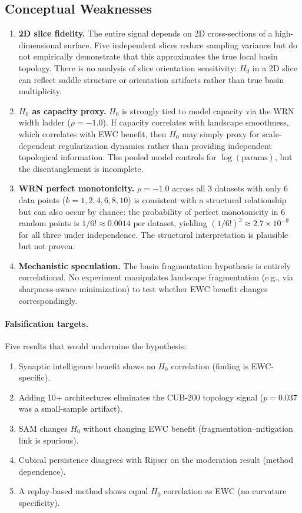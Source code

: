 \documentclass[10pt,twocolumn]{article}
\begin{document}
\subsection{Conceptual Weaknesses}
\begin{enumerate}
    \item \textbf{2D slice fidelity.} The entire signal depends on 2D cross-sections of a high-dimensional surface. Five independent slices reduce sampling variance but do not empirically demonstrate that this approximates the true local basin topology. There is no analysis of slice orientation sensitivity: $H_0$ in a 2D slice can reflect saddle structure or orientation artifacts rather than true basin multiplicity.
    \item \textbf{$H_0$ as capacity proxy.} $H_0$ is strongly tied to model capacity via the WRN width ladder ($\rho = -1.0$). If capacity correlates with landscape smoothness, which correlates with EWC benefit, then $H_0$ may simply proxy for scale-dependent regularization dynamics rather than providing independent topological information. The pooled model controls for $\log(\text{params})$, but the disentanglement is incomplete.
    \item \textbf{WRN perfect monotonicity.} $\rho = -1.0$ across all 3 datasets with only 6 data points ($k = 1, 2, 4, 6, 8, 10$) is consistent with a structural relationship but can also occur by chance: the probability of perfect monotonicity in 6 random points is $1/6! \approx 0.0014$ per dataset, yielding $(1/6!)^3 \approx 2.7 \times 10^{-9}$ for all three under independence. The structural interpretation is plausible but not proven.
    \item \textbf{Mechanistic speculation.} The basin fragmentation hypothesis is entirely correlational. No experiment manipulates landscape fragmentation (e.g., via sharpness-aware minimization) to test whether EWC benefit changes correspondingly.
\end{enumerate}

\paragraph{Falsification targets.} Five results that would undermine the hypothesis:
\begin{enumerate}
    \item Synaptic intelligence benefit shows no $H_0$ correlation (finding is EWC-specific).
    \item Adding 10+ architectures eliminates the CUB-200 topology signal ($p = 0.037$ was a small-sample artifact).
    \item SAM changes $H_0$ without changing EWC benefit (fragmentation--mitigation link is spurious).
    \item Cubical persistence disagrees with Ripser on the moderation result (method dependence).
    \item A replay-based method shows equal $H_0$ correlation as EWC (no curvature specificity).
\end{enumerate}
\end{document}
